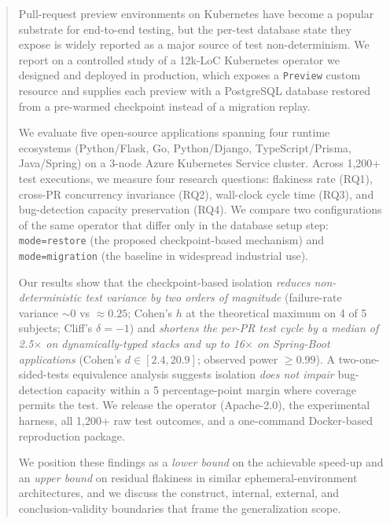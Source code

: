 
\begin{abstract}
Pull-request preview environments on Kubernetes have become a popular
substrate for end-to-end testing, but the per-test database state they
expose is widely reported as a major source of test non-determinism. We
report on a controlled study of a 12k-LoC Kubernetes operator we
designed and deployed in production, which exposes a
\texttt{Preview} custom resource and supplies each preview with a
PostgreSQL database restored from a pre-warmed checkpoint instead of a
migration replay.

We evaluate five open-source applications spanning four runtime
ecosystems (Python/Flask, Go, Python/Django, TypeScript/Prisma,
Java/Spring) on a 3-node Azure Kubernetes Service cluster. Across
1{,}200+ test executions, we measure four research questions:
flakiness rate (RQ1), cross-PR concurrency invariance (RQ2), wall-clock
cycle time (RQ3), and bug-detection capacity preservation (RQ4).
We compare two configurations of the same operator that differ only in
the database setup step: \texttt{mode=restore} (the proposed
checkpoint-based mechanism) and \texttt{mode=migration} (the baseline
in widespread industrial use).

Our results show that the checkpoint-based isolation
\emph{reduces non-deterministic test variance by two orders of
magnitude} (failure-rate variance ${\sim}0$ vs $\approx 0.25$;
Cohen's $h$ at the theoretical maximum on 4 of 5 subjects; Cliff's
$\delta=-1$) and \emph{shortens the per-PR test cycle by a median of
2.5$\times$ on dynamically-typed stacks and up to 16$\times$ on
Spring-Boot applications} (Cohen's $d \in [2.4, 20.9]$; observed power
$\ge 0.99$). A two-one-sided-tests equivalence analysis suggests
isolation \emph{does not impair} bug-detection capacity within a 5
percentage-point margin where coverage permits the test. We release
the operator (Apache-2.0), the experimental harness, all 1{,}200+ raw
test outcomes, and a one-command Docker-based reproduction package.

We position these findings as a \emph{lower bound} on the achievable
speed-up and an \emph{upper bound} on residual flakiness in similar
ephemeral-environment architectures, and we discuss the construct,
internal, external, and conclusion-validity boundaries that frame the
generalization scope.
\end{abstract}

